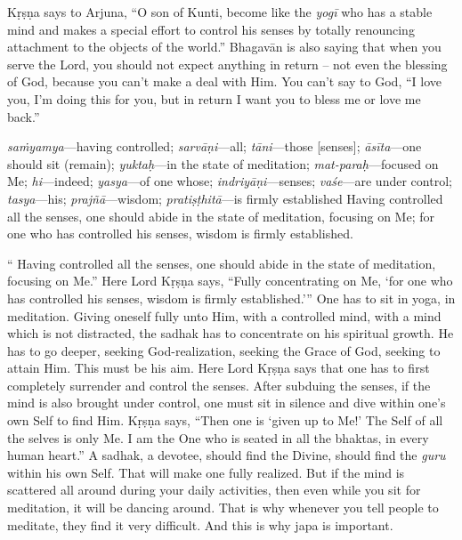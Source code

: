 Kṛṣṇa says to Arjuna, “O son of Kunti, become like the \textit{yogī} who has a stable mind and makes a special effort to control his senses by totally renouncing attachment to the objects of the world.” Bhagavān is also saying that when you serve the Lord, you should not expect anything in return – not even the blessing of God, because you can’t make a deal with Him. You can’t say to God, “I love you, I’m doing this for you, but in return I want you to bless me or love me back.”

{%
  \textit{saṁyamya}---having controlled; 
  \textit{sarvāṇi}---all; 
  \textit{tāni}---those [senses]; 
  \textit{āsīta}---one should sit (remain); 
  \textit{yuktaḥ}---in the state of meditation; 
  \textit{mat-paraḥ}---focused on Me; 
  \textit{hi}---indeed; 
  \textit{yasya}---of one whose; 
  \textit{indriyāṇi}---senses; 
  \textit{vaśe}---are under control; 
  \textit{tasya}---his; 
  \textit{prajñā}---wisdom; 
  \textit{pratiṣṭhitā}---is firmly established
}
{%
  Having controlled all the senses, one should abide in the state of meditation, focusing on Me; for one who has controlled his senses, wisdom is firmly established.
}

“ Having controlled all the senses, one should abide in the state of meditation, focusing on Me.” Here Lord Kṛṣṇa says, “Fully concentrating on Me, ‘for one who has controlled his senses, wisdom is firmly established.’” One has to sit in yoga, in meditation. Giving oneself fully unto Him, with a controlled mind, with a mind which is not distracted, the sadhak has to concentrate on his spiritual growth. He has to go deeper, seeking God-realization, seeking the Grace of God, seeking to attain Him. This must be his aim. Here Lord Kṛṣṇa says that one has to first completely surrender and control the senses. After subduing the senses, if the mind is also brought under control, one must sit in silence and dive within one’s own Self to find Him. Kṛṣṇa says, “Then one is ‘given up to Me!’ The Self of all the selves is only Me. I am the One who is seated in all the bhaktas, in every human heart.” A sadhak, a devotee, should find the Divine, should find the \textit{guru} within his own Self. That will make one fully realized. But if the mind is scattered all around during your daily activities, then even while you sit for meditation, it will be dancing around. That is why whenever you tell people to meditate, they find it very difficult. And this is why japa is important.

